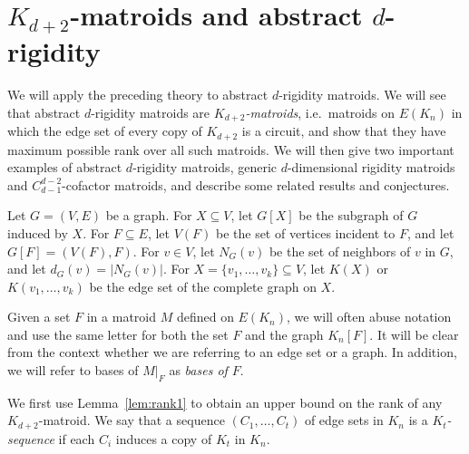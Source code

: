 \documentclass{daj}
\begin{document}
\section{\boldmath $K_{d+2}$-matroids and abstract $d$-rigidity}\label{sec:rigidity}
We will apply the preceding theory to 
abstract $d$-rigidity matroids.
We will see that abstract $d$-rigidity matroids are {\em $K_{d+2}$-matroids}, i.e.~matroids on $E(K_n)$ in which the edge set of every copy of $K_{d+2}$ is a circuit,  and show that they have maximum possible rank over all such matroids. We will then  give two important examples of abstract $d$-rigidity matroids,
generic $d$-dimensional rigidity matroids and $C_{d-1}^{d-2}$-cofactor matroids, and describe some related results and conjectures.

Let $G=(V,E)$ be a graph. 
For $X\subseteq V$, let $G[X]$ be the subgraph of $G$ induced by $X$.
For $F\subseteq E$, let $V(F)$ be the set of vertices incident to $F$, and let $G[F]=(V(F),F)$.
For $v\in V$, let $N_G(v)$ be the set of neighbors of $v$ in $G$, and let $d_G(v)=|N_G(v)|$.
For $X=\{v_1,\dots, v_k\}\subseteq V$, let $K(X)$ or $K(v_1,\dots, v_k)$ be the edge set of the complete graph on $X$.

Given a set $F$ in a matroid $M$ defined on $E(K_n)$, we will often abuse notation and use the same letter for both the set $F$ and the graph 
$K_n[F]$.
It will be clear from the context whether we are referring to an edge set or a graph. In addition, we will refer to bases of $M|_F$ as {\em bases of $F$}.

We first use Lemma~\ref{lem:rank1} to obtain an upper bound on the rank of any $K_{d+2}$-matroid. We say that a sequence $(C_1,\dots, C_t)$ of edge sets in $K_n$ is a {\em $K_{t}$-sequence} if each $C_i$ induces a copy of $K_{t}$ in $K_n$.
\end{document}
